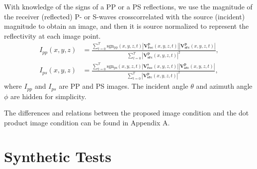 \documentclass[manuscript,ulem,graphix,revised]{geophysics}
\begin{document}
With knowledge of the signs of a PP or a PS reflections, we use the magnitude of the receiver (reflected) P- or S-waves crosscorrelated with the source (incident) magnitude to obtain an image, and then it is source normalized to represent the reflectivity \citep{sheriff95} at each image point.
\begin{equation}
\begin{aligned}
I_{pp}(x,y,z)&=\frac{\sum_{t=0}^{T}\mathrm{sgn_{pp}}(x,y,z,t)|\mathbf{V^p_{rec}}(x,y,z,t)||\mathbf{V^p_{src}}(x,y,z,t)|}
                    {\sum_{t=0}^{T}|\mathbf{V^p_{src}}(x,y,z,t)|^2 },\\
I_{ps}(x,y,z)&=\frac{\sum_{t=0}^{T}\mathrm{sgn_{ps}}(x,y,z,t)|\mathbf{V^s_{rec}}(x,y,z,t)||\mathbf{V^p_{src}}(x,y,z,t)|}
                    {\sum_{t=0}^{T}|\mathbf{V^p_{src}}(x,y,z,t)|^2 },
\end{aligned}
\label{eqn:reflectivity}
\end{equation}
where $I_{pp}$ and $I_{ps}$ are PP and PS images. The incident angle $\theta$ and azimuth angle $\phi$ are hidden for simplicity.

The differences and relations between the proposed image condition and the dot product image condition \citep{wang_cl16, du17} can be found in Appendix A.



\section{Synthetic Tests}
\end{document}
